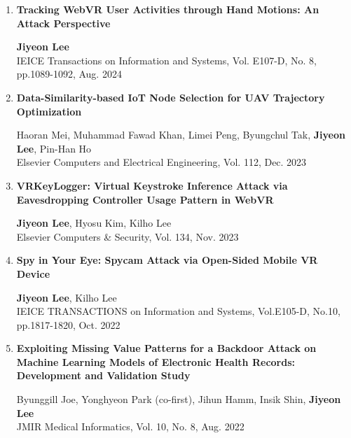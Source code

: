 \documentclass[11pt,letterpaper]{article}
\begin{document}
\begin{enumerate}



		\item \textbf{Tracking WebVR User Activities through Hand Motions: An Attack Perspective} \\
	\begin{small}
		\textbf{Jiyeon Lee}\\ 
	IEICE Transactions on Information and Systems, Vol. E107-D, No. 8, pp.1089-1092, Aug. 2024
	\end{small}

		\item \textbf{Data-Similarity-based IoT Node Selection for UAV Trajectory Optimization} \\
	\begin{small}
		Haoran Mei, Muhammad Fawad Khan, Limei Peng, Byungchul Tak, \textbf{Jiyeon Lee},  Pin-Han Ho\\ 
		Elsevier Computers and Electrical Engineering, Vol. 112, Dec. 2023
	\end{small}

		\item \textbf{VRKeyLogger: Virtual Keystroke Inference Attack via Eavesdropping Controller Usage Pattern in WebVR} \\
	\begin{small}
		\textbf{Jiyeon Lee}, Hyosu Kim, Kilho Lee \\ 
		Elsevier Computers \& Security, Vol. 134, Nov. 2023
	\end{small}
	
		\item \textbf{Spy in Your Eye: Spycam Attack via Open-Sided Mobile VR Device} \\
	\begin{small}
		\textbf{Jiyeon Lee}, Kilho Lee \\ 
		IEICE TRANSACTIONS on Information and Systems, Vol.E105-D, No.10, pp.1817-1820, Oct. 2022
	\end{small}
	
		\item \textbf{Exploiting Missing Value Patterns for a Backdoor Attack on Machine Learning Models of Electronic Health Records: Development and Validation Study} \\
	\begin{small}
		Byunggill Joe, Yonghyeon Park (co-first), Jihun Hamm, Insik Shin, \textbf{Jiyeon Lee} \\ 
JMIR Medical Informatics, Vol. 10, No. 8, Aug. 2022
	\end{small}
	

\end{enumerate}
\end{document}
